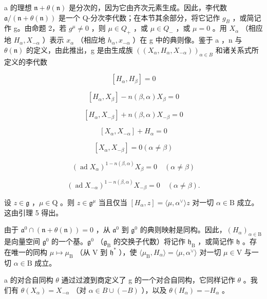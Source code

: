 a 的理想 \(\mathfrak{n} + \theta(\mathfrak{n})\) 是分次的，因为它由齐次元素生成。因此，李代数 \(\mathfrak{a}/(\mathfrak{n}+\theta(\mathfrak{n}))\) 是一个 Q-分次李代数；在本节其余部分，将它记作 \(g_{B}\) ，或简记作 g。由命题 2，若 \(g^{\mu} \neq 0\) ，则 \(\mu \in Q_{+}\) ，或 \(\mu \in Q_{-}\) ，或 \(\mu = 0\) 。用 \(X_{\alpha}\) （相应地 \(H_{\alpha}, X_{-\alpha}\) ）表示 \(x_{\alpha}\) （相应地 \(h_{\alpha}, x_{-\alpha}\) ）在 g 中的典则像。鉴于 a ，n 与 \(\theta(\mathfrak{n})\) 的定义，由此推出，g 是由生成族 \(((X_{\alpha}, H_{\alpha}, X_{-\alpha}))_{\alpha \in B}\) 和诸关系式所定义的李代数

\[
[ H _ {\alpha}, H _ {\beta} ] = 0\tag{16}
\]

\[
[ H _ {\alpha}, X _ {\beta} ] - n (\beta , \alpha) X _ {\beta} = 0\tag{17}
\]

\[
[ H _ {\alpha}, X _ {- \beta} ] + n (\beta , \alpha) X _ {- \beta} = 0\tag{18}
\]

\[
[ X _ {\alpha}, X _ {- \alpha} ] + H _ {\alpha} = 0\tag{19}
\]

\[
[ X _ {\alpha}, X _ {- \beta} ] = 0 (\alpha \neq \beta)\tag{20}
\]

\[
(\operatorname{ad} X _ {\alpha}) ^ {1 - n (\beta , \alpha)} X _ {\beta} = 0 \quad (\alpha \neq \beta)\tag{21}
\]

\[
(\operatorname{ad} X _ {- \alpha}) ^ {1 - n (\beta , \alpha)} X _ {- \beta} = 0 \quad (\alpha \neq \beta).\tag{22}
\]

设 \(z \in \mathfrak{g}\) ，\(\mu \in \mathrm{Q}\) 。则 \(z \in \mathfrak{g}^{\mu}\) 当且仅当 \([H_{\alpha}, z] = \langle \mu, \alpha^{\vee} \rangle z\) 对一切 \(\alpha \in \mathrm{B}\) 成立。这由引理 5 得出。

由于 \(\mathfrak{a}^0\cap (\mathfrak{n} + \theta (\mathfrak{n})) = 0\) ，从 \(\mathfrak{a}^0\) 到 \(\mathfrak{g}^0\) 的典则映射是同构。因此，\((H_{\alpha})_{\alpha \in \mathrm{B}}\) 是向量空间 \(\mathfrak{g}^0\) 的一个基。\(\mathfrak{g}^0\) （\(\mathfrak{g}_{\mathrm{B}}\) 的交换子代数）将记作 \(\mathfrak{h}_{\mathrm{B}}\) ，或简记作 \(\mathfrak{h}\) 。存在唯一的同构 \(\mu \mapsto \mu_{\mathrm{B}}\) （从 V 到 \(\mathfrak{h}^*\) ），使 \(\langle \mu_{\mathrm{B}},H_{\alpha}\rangle = \langle \mu ,\alpha^{\vee}\rangle\) 对一切 \(\mu \in \mathrm{V}\) 与一切 \(\alpha \in \mathrm{B}\) 成立。

a 的对合自同构 \(\theta\) 通过过渡到商定义了 g 的一个对合自同构，它同样记作 \(\theta\) 。我们有 \(\theta(X_{\alpha}) = X_{-\alpha}\) （对 \(\alpha \in B \cup (-B)\) ），以及 \(\theta(H_{\alpha}) = -H_{\alpha}\) 。

